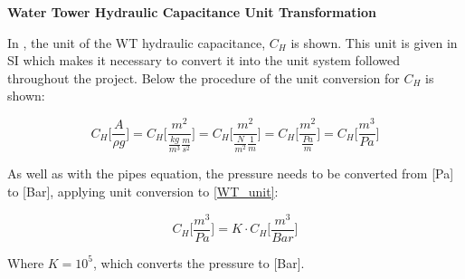 \textbf{Water Tower Hydraulic Capacitance Unit Transformation}

In , the unit of the WT hydraulic capacitance, $C_H$ is shown. This unit is given in SI which makes it necessary to convert it into the unit system followed throughout the project. Below the procedure of the unit conversion for $C_H$ is shown: 

\begin{equation}
	C_H \Bigg[\frac{A}{\rho g}\Bigg] = C_H \Bigg[\frac{m^2}{\frac{kg}{m^3} \frac{m}{s^2}}\Bigg]= C_H \Bigg[\frac{m^2}{\frac{N}{m^2} \frac{1}{m}}\Bigg] =  C_H \Bigg[\frac{m^2}{\frac{Pa}{m}}\Bigg] = C_H \Bigg[\frac{m^3}{Pa}\Bigg]
	\label{WT_unit}
\end{equation}


As well as with the pipes equation, the pressure needs to be converted from [Pa] to [Bar], applying unit conversion to \eqref{WT_unit}:

\begin{equation}
	C_H \Bigg[\frac{m^3}{Pa}\Bigg] = K \cdot C_H \Bigg[\frac{m^{3}}{Bar}\Bigg]
	\label{WT_unit_final}
\end{equation}


Where $K = 10^5$, which converts the pressure to [Bar]. 